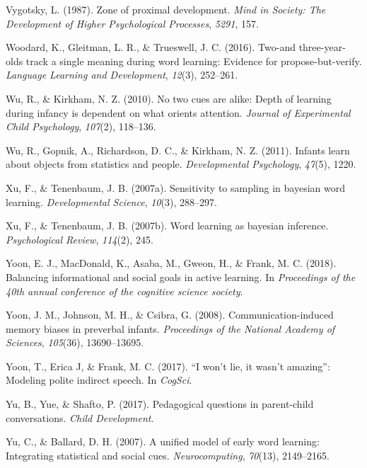 \documentclass[oneside]{report}
\begin{document}
\hypertarget{ref-vygotsky1987zone}{}
Vygotsky, L. (1987). Zone of proximal development. \emph{Mind in
Society: The Development of Higher Psychological Processes},
\emph{5291}, 157.

\hypertarget{ref-woodard2016two}{}
Woodard, K., Gleitman, L. R., \& Trueswell, J. C. (2016). Two-and
three-year-olds track a single meaning during word learning: Evidence
for propose-but-verify. \emph{Language Learning and Development},
\emph{12}(3), 252--261.

\hypertarget{ref-wu2010no}{}
Wu, R., \& Kirkham, N. Z. (2010). No two cues are alike: Depth of
learning during infancy is dependent on what orients attention.
\emph{Journal of Experimental Child Psychology}, \emph{107}(2),
118--136.

\hypertarget{ref-wu2011infants}{}
Wu, R., Gopnik, A., Richardson, D. C., \& Kirkham, N. Z. (2011). Infants
learn about objects from statistics and people. \emph{Developmental
Psychology}, \emph{47}(5), 1220.

\hypertarget{ref-xu2007sampling}{}
Xu, F., \& Tenenbaum, J. B. (2007a). Sensitivity to sampling in bayesian
word learning. \emph{Developmental Science}, \emph{10}(3), 288--297.

\hypertarget{ref-xu2007word}{}
Xu, F., \& Tenenbaum, J. B. (2007b). Word learning as bayesian
inference. \emph{Psychological Review}, \emph{114}(2), 245.

\hypertarget{ref-yoon2018balancing}{}
Yoon, E. J., MacDonald, K., Asaba, M., Gweon, H., \& Frank, M. C.
(2018). Balancing informational and social goals in active learning. In
\emph{Proceedings of the 40th annual conference of the cognitive science
society}.

\hypertarget{ref-yoon2008communication}{}
Yoon, J. M., Johnson, M. H., \& Csibra, G. (2008). Communication-induced
memory biases in preverbal infants. \emph{Proceedings of the National
Academy of Sciences}, \emph{105}(36), 13690--13695.

\hypertarget{ref-yoonwon}{}
Yoon, T., Erica J, \& Frank, M. C. (2017). ``I won't lie, it wasn't
amazing'': Modeling polite indirect speech. In \emph{CogSci}.

\hypertarget{ref-yu2017peagogical}{}
Yu, B., Yue, \& Shafto, P. (2017). Pedagogical questions in parent-child
conversations. \emph{Child Development}.

\hypertarget{ref-yu2007unified}{}
Yu, C., \& Ballard, D. H. (2007). A unified model of early word
learning: Integrating statistical and social cues.
\emph{Neurocomputing}, \emph{70}(13), 2149--2165.
\end{document}
